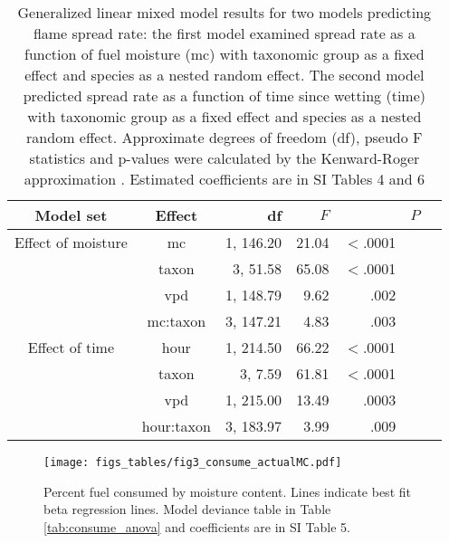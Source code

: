\documentclass[letterpaper,12pt]{article}
\begin{document}
\begin{table}[h]
  \caption{Generalized linear mixed model results for two models predicting
    flame spread rate: the first model examined spread rate as a function of
    fuel moisture (mc) with taxonomic group as a fixed effect and species as a
    nested random effect. The second model predicted spread rate as a function
    of time since wetting (time) with taxonomic group as a fixed effect and
    species as a nested random effect. Approximate degrees of freedom (df),
    pseudo F statistics and p-values were calculated by the Kenward-Roger
    approximation \citep{Kenward_Roger-1997}. Estimated coefficients are in SI
    Tables 4 and 6}
  \label{tab:spreadrate_anova}
  
\centering
\begin{tabular}{ccrrrrr}
  \toprule
Model set & Effect & df & $F$ & & $P$ \\
  \midrule
  Effect of moisture & mc & 1, 146.20 & 21.04 & $<$.0001 \\ 
 & taxon & 3, 51.58 & 65.08 & $<$.0001 \\ 
 & vpd & 1, 148.79 & 9.62 & .002 \\ 
 & mc:taxon & 3, 147.21 & 4.83 & .003 \\ 
   
  \midrule
  
  Effect of time & hour & 1, 214.50 & 66.22 & $<$.0001 \\ 
 &  taxon & 3, 7.59 & 61.81 & $<$.0001 \\ 
 & vpd & 1, 215.00 & 13.49 & .0003 \\ 
 & hour:taxon & 3, 183.97 & 3.99 & .009 \\ 

   \bottomrule

\end{tabular}
\end{table}

\begin{figure}[h]
  \centering
\texttt{[image: figs\_tables/fig3\_consume\_actualMC.pdf]}
\caption{Percent fuel consumed by moisture content. Lines indicate best fit
  beta regression lines. Model deviance table in Table \ref{tab:consume_anova}
  and coefficients are in SI Table 5.}
  \label{fig:consume_moist}
\end{figure}
\end{document}

